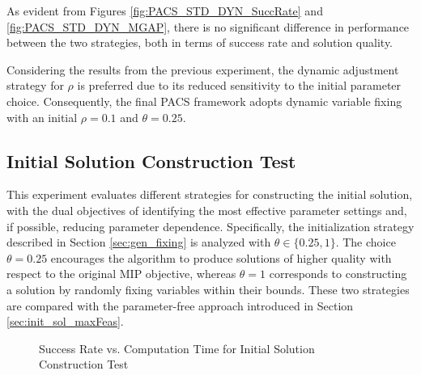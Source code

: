 As evident from Figures \ref{fig:PACS_STD_DYN_SuccRate} and \ref{fig:PACS_STD_DYN_MGAP}, there is no significant difference in performance between the two strategies, both in terms of success rate and solution quality.

Considering the results from the previous experiment, the dynamic adjustment strategy for $\rho$ is preferred due to its reduced sensitivity to the initial parameter choice. Consequently, the final PACS framework adopts dynamic variable fixing with an initial $\rho = 0.1$ and $\theta = 0.25$.

\subsection{Initial Solution Construction Test}\label{sec:test_init_sol}
This experiment evaluates different strategies for constructing the initial solution, with the dual objectives of identifying the most effective parameter settings and, if possible, reducing parameter dependence. Specifically, the initialization strategy described in Section \ref{sec:gen_fixing} is analyzed with $\theta \in \{0.25, 1\}$. The choice $\theta = 0.25$ encourages the algorithm to produce solutions of higher quality with respect to the original MIP objective, whereas $\theta = 1$ corresponds to constructing a solution by randomly fixing variables within their bounds. These two strategies are compared with the parameter-free approach introduced in Section \ref{sec:init_sol_maxFeas}.  
\begin{figure}[H]
    \centering
    \begin{minipage}{0.6\columnwidth}
        \centering
        \resizebox{\linewidth}{!}{}
    \end{minipage}%
    \hfill
    \begin{minipage}{0.4\columnwidth} 
        \centering
        \resizebox{\linewidth}{!}{}
    \end{minipage}
    \caption{Success Rate vs. Computation Time for Initial Solution Construction Test}
    \label{fig:PACS_InitSol_SuccRate}
\end{figure}

